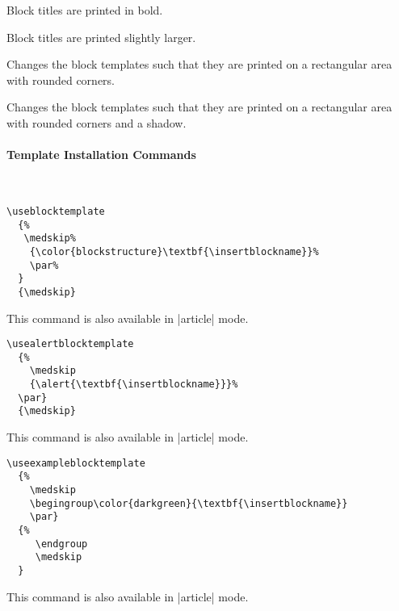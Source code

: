 \begin{command}{\beamertemplateboldblocks}
  Block titles are printed in bold.
\end{command}

\begin{command}{\beamertemplatelargeblocks}
  Block titles are printed slightly larger.
\end{command}

\begin{command}{\beamertemplateroundedblocks}
  Changes the block templates such that they are printed on a
  rectangular area with rounded corners.
\end{command}

\begin{command}{\beamertemplateshadowblocks}
  Changes the block templates such that they are printed on a
  rectangular area with rounded corners and a shadow.
\end{command}



\paragraph{Template Installation Commands}\

\begin{command}{\useblocktemplate{}}
  \example
\begin{verbatim}
\useblocktemplate
  {%
   \medskip%
    {\color{blockstructure}\textbf{\insertblockname}}%
    \par%
  }
  {\medskip}
\end{verbatim}

  \articlenote
  This command is also available in |article| mode.
\end{command}


\begin{command}{\usealertblocktemplate{}}
  \example
\begin{verbatim}
\usealertblocktemplate
  {%
    \medskip
    {\alert{\textbf{\insertblockname}}}%
  \par}
  {\medskip}
\end{verbatim}

  \articlenote
  This command is also available in |article| mode.
\end{command}


\begin{command}{\useexampleblocktemplate{}}
  \example
\begin{verbatim}
\useexampleblocktemplate
  {%
    \medskip
    \begingroup\color{darkgreen}{\textbf{\insertblockname}}
    \par}
  {%
     \endgroup
     \medskip
  }
\end{verbatim}

  \articlenote
  This command is also available in |article| mode.
\end{command}


